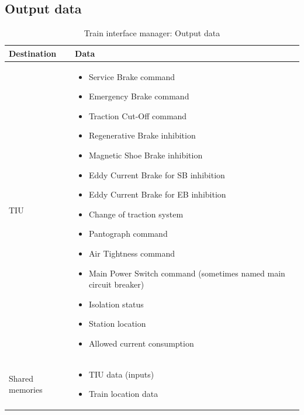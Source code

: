 \documentclass[nocc]{template/openetcs_report}
\begin{document}
\subsection{Output data}
			\begin{longtable}{|l|l|}
				\caption{Train interface manager: Output data}\\ 
				\hline
				
					\begin{minipage}[t]{0.35\linewidth} \textbf{Destination}	\end{minipage} 
				&	\begin{minipage}[t]{0.65\linewidth} \textbf{Data} \end{minipage} \\
				
				\hline
																																													
					\begin{minipage}[t]{0.35\linewidth} TIU	\end{minipage} 
				&	\begin{minipage}[t]{0.65\linewidth}
						\begin{itemize}
							\item Service Brake command
							\item Emergency Brake command
							\item Traction Cut-Off command
							\item Regenerative Brake inhibition
							\item Magnetic Shoe Brake inhibition
							\item Eddy Current Brake for SB inhibition
							\item Eddy Current Brake for EB inhibition
							\item Change of traction system
							\item Pantograph command
							\item Air Tightness command
							\item Main Power Switch command (sometimes named main circuit breaker)
							\item Isolation status
							\item Station location
							\item Allowed current consumption
						\end{itemize}			
					\end{minipage} \\
				
				\hline	
				
					\begin{minipage}[t]{0.35\linewidth} Shared memories	\end{minipage} 
				&	\begin{minipage}[t]{0.65\linewidth}
						\begin{itemize}
							\item TIU data (inputs)
							\item Train location data
						\end{itemize}				
					\end{minipage} \\
				
				\hline	
			\end{longtable}
\newpage
\end{document}
